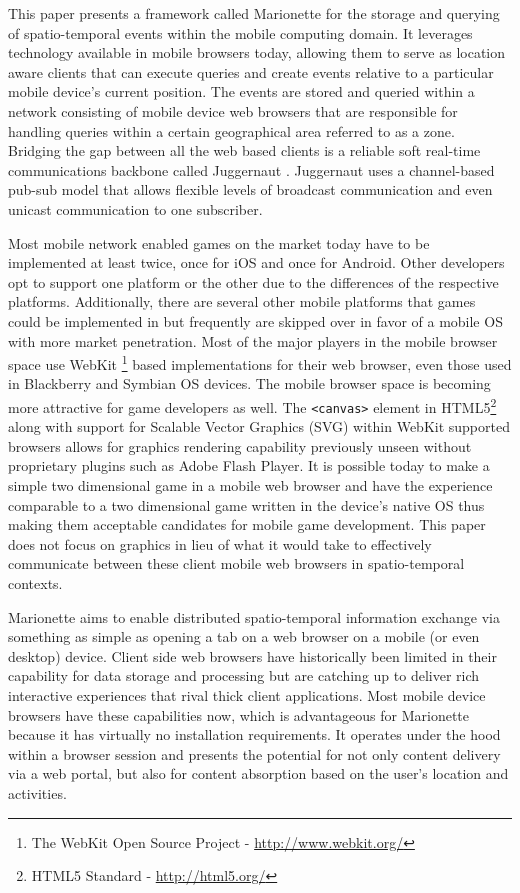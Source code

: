 \documentclass[12pt]{report}	%
\theoremstyle{definition}
\theoremstyle{remark}
\begin{document}
This paper presents a framework called Marionette for the storage and
querying of spatio-temporal events within the mobile computing domain.
It leverages technology available in mobile browsers today, allowing
them to serve as location aware clients that can execute queries and
create events relative to a particular mobile device's current position. The events are
stored and queried within a network consisting of mobile device web
browsers that are responsible for handling queries within a certain
geographical area referred to as a zone. Bridging the gap between all
the web based clients is a reliable soft real-time communications
backbone called Juggernaut \cite{juggernaut}. Juggernaut uses a channel-based pub-sub
model that allows flexible levels of broadcast communication and even
unicast communication to one subscriber.

Most mobile network enabled games on the market today have to be
implemented at least twice, once for iOS and once for Android. Other
developers opt to support one platform or the other due to the
differences of the respective platforms. Additionally, there are several
other mobile platforms that games could be implemented in but frequently are
skipped over in favor of a mobile OS with more market penetration. Most
of the major players in the mobile browser space use WebKit
\footnote{The WebKit Open Source Project - \url{http://www.webkit.org/}} based
implementations for their web browser, even those used in Blackberry and
Symbian OS devices. The mobile browser space is becoming more attractive
for game developers as well. The \texttt{<canvas>} element in 
HTML5\footnote{HTML5 Standard - \url{http://html5.org/}} along with
support for Scalable Vector Graphics (SVG) within WebKit supported
browsers allows for graphics rendering capability previously unseen without
proprietary plugins such as Adobe Flash Player. It is possible today to
make a simple two dimensional game in a mobile web browser and have the
experience comparable to a two dimensional game written in the device's native
OS thus making them acceptable candidates for mobile game development. 
This paper does not focus on graphics in lieu of what it would take to 
effectively communicate between these client mobile web browsers in 
spatio-temporal contexts.

Marionette aims to enable distributed spatio-temporal information
exchange via something as simple as opening a tab on a web browser on a
mobile (or even desktop) device. Client side web browsers have
historically been limited in their capability for data storage and
processing but are catching up to deliver rich interactive experiences
that rival thick client applications. Most mobile device browsers have
these capabilities now, which is advantageous for Marionette because it
has virtually no installation requirements. It operates under the hood
within a browser session and presents the potential for not only content
delivery via a web portal, but also for content absorption based on the
user's location and activities.
\end{document}
